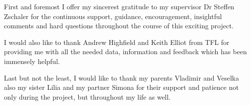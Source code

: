 First and foremost I offer my sincerest gratitude to my supervisor Dr Steffen Zschaler for the continuous support, guidance, encouragement, insightful comments and hard questions throughout the course of this exciting project.

I would also like to thank Andrew Highfield and Keith Elliot from TFL for providing me with all the needed data, information and feedback which has been immensely helpful.

Last but not the least, I would like to thank my parents Vladimir and Veselka also my sister Lilia and my partner Simona for their support and patience not only during the project, but throughout my life as well.